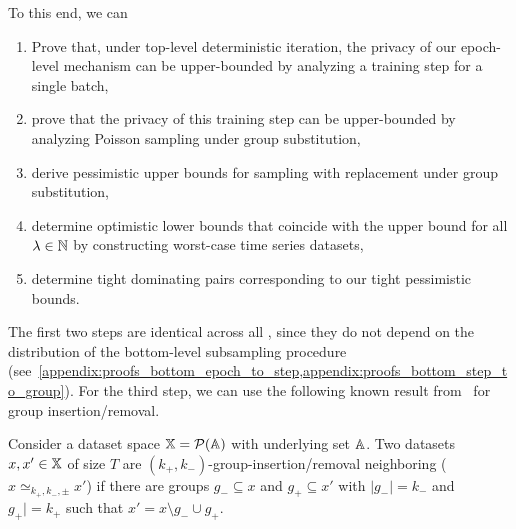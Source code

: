 To this end, we can 
\begin{enumerate}
    \item Prove that, under top-level deterministic iteration, the privacy of our epoch-level mechanism can be upper-bounded by  analyzing a training step for a single batch,
    \item prove that the privacy of this training step can be upper-bounded by analyzing Poisson sampling under group substitution,
    \item derive pessimistic upper bounds for sampling with replacement under group substitution,
    \item determine optimistic lower bounds that coincide with the upper bound for all $\lambda \in {\mathbb{N}}$ by constructing worst-case time series datasets,
    \item determine tight dominating pairs corresponding to our tight pessimistic bounds.
\end{enumerate}
The first two steps are identical across all , since they do not depend on the distribution of the bottom-level subsampling procedure (see~\cref{appendix:proofs_bottom_epoch_to_step,appendix:proofs_bottom_step_to_group}).
For the third step, we can use the following known result from~\cite{schuchardt2024unified} for group insertion/removal.
\begin{definition}
    Consider a dataset space ${\mathbb{X}} = \mathcal{P}({\mathbb{A}})$ with underlying set ${\mathbb{A}}$.
    Two datasets $x, x' \in {\mathbb{X}}$ of size $T$ are $(k_+,k_-)$-group-insertion/removal neighboring
    ($x \simeq_{k_+,k_-,\pm} x'$)
    if there are groups $g_- \subseteq x$ and $g_+ \subseteq x'$  with $|g_-| = k_-$ and $g_+| = k_+$
    such that $x' =   x \setminus g_- \cup g_+$.
\end{definition}
